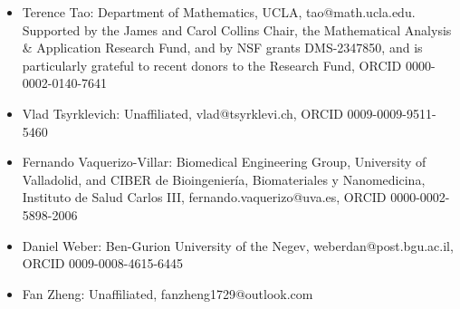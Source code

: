 \begin{itemize}
    \item Terence Tao: Department of Mathematics, UCLA, tao@math.ucla.edu. Supported by the James and Carol Collins Chair, the Mathematical Analysis \& Application Research Fund, and by NSF grants DMS-2347850, and is particularly grateful to recent donors to the Research Fund, ORCID 0000-0002-0140-7641
    \item Vlad Tsyrklevich: Unaffiliated, vlad@tsyrklevi.ch, ORCID 0009-0009-9511-5460
    \item Fernando Vaquerizo-Villar: Biomedical Engineering Group, University of Valladolid, and CIBER de Bioingeniería, Biomateriales y Nanomedicina, Instituto de Salud Carlos III, fernando.vaquerizo@uva.es, ORCID 0000-0002-5898-2006
    \item Daniel Weber: Ben-Gurion University of the Negev, weberdan@post.bgu.ac.il, ORCID 0009-0008-4615-6445
    \item Fan Zheng: Unaffiliated, fanzheng1729@outlook.com
\end{itemize}
